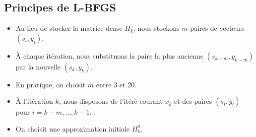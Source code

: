 \subsection{Principes de L-BFGS}

\begin{itemize}
    \item Au lieu de stocker la matrice dense $H_k$, nous stockons $m$ paires de vecteurs $(s_i, y_i)$.
    \item À chaque itération, nous substituons la paire la plus ancienne $(s_{k-m}, y_{k-m})$ par la nouvelle $(s_k, y_k)$.
    \item En pratique, on choisit $m$ entre 3 et 20.
    \item À l'itération $k$, nous disposons de l'itéré courant $x_k$ et des paires $(s_i, y_i)$ pour $i = k-m, \dots, k-1$.
    \item On choisit une approximation initiale $H_k^0$.
\end{itemize}

